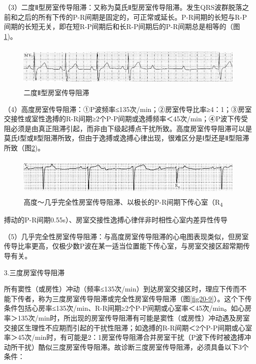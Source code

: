 （3）二度Ⅱ型房室传导阻滞：又称为莫氏Ⅱ型房室传导阻滞。发生QRS波群脱落之前和之后的所有下传的P-R间期是固定的，可正常或延长。P-R间期的长短与R-P间期的长短无关，即在短R-P间期后和长R-P间期后的P-R间期总是相等的（图\ref{fig20-7})。

\begin{figure}[!htbp]
 \centering
 \includegraphics[width=5.58333in,height=0.79167in]{./images/Image00336.jpg}
 \captionsetup{justification=centering}
 \caption{二度Ⅱ型房室传导阻滞}
 \label{fig20-7}
  \end{figure} 

（4）高度房室传导阻滞：①P波频率≤135次/min；②房室传导比率≥4：1；③房室交接性或室性逸搏的R-R间期≥2个P-P间期或逸搏频率＜45次/min；④P波下传受阻必须是由真正阻滞引起，而非由下级起搏点干扰所致。高度房室传导阻滞可以是莫氏Ⅰ型或Ⅱ型阻滞所致，但由于逸搏或逸搏心律出现，很难区分是Ⅰ型还是Ⅱ型阻滞所致（图\ref{fig20-8})。

\begin{figure}[!htbp]
 \centering
 \includegraphics[width=5.58333in,height=0.75in]{./images/Image00337.jpg}
 \captionsetup{justification=centering}
 \caption{高度～几乎完全性房室传导阻滞、以极长的P-R间期下传心室（R\textsubscript{4}}
 \label{fig20-8}
  \end{figure} 
搏动的P-R间期0.55s）、房室交接性逸搏心律伴非时相性心室内差异性传导

（5）几乎完全性房室传导阻滞：与高度房室传导阻滞的心电图表现类似，但房室传导比率更高，仅极少数P波在某一适当位置能下传心室，与房室交接区超常期传导有关。

3.三度房室传导阻滞

所有窦性（或房性）冲动（频率≤135次/min）到达房室交接区时，理应下传而不能下传者，称为三度房室传导阻滞或完全性房室传导阻滞（图\ref{fig20-9}）。这个下传条件包括心房率≤135次/min、R-R间期≥2个P-P间期或心室率＜45次/min。如心房率＞135次/min时，所出现的房室传导阻滞有可能是窦性（或房性）冲动遇及房室交接区生理性不应期而引起的干扰性阻滞；如逸搏的R-R间期＜2个P-P间期或心室率＞45次/min时，有可能是2：1房室传导阻滞合并房室干扰（P波下传时被逸搏冲动所干扰）酷似三度房室传导阻滞。故诊断三度房室传导阻滞，必须具备以下3个条件：

